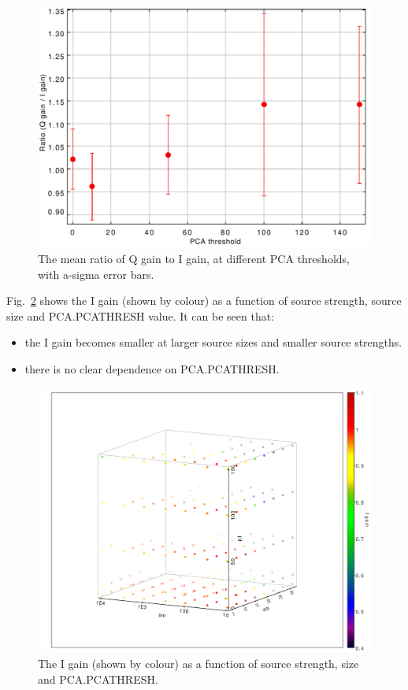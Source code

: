 \documentclass[twoside,11pt]{starlink}
\begin{document}
\begin{figure}
\includegraphics[width=0.9\columnwidth]{figs/ratio-pt}
\caption{The mean ratio of Q gain to I gain, at different PCA thresholds,
with a-sigma error bars.}
\label{fig:ratio-pt}
\end{figure}



Fig.~\ref{fig:igain} shows the I gain (shown by colour) as a function of source strength,
source size and PCA.PCATHRESH value. It can be seen that:

\begin{itemize}
\item the I gain becomes smaller at larger source sizes and smaller
source strengths.
\item there is no clear dependence on PCA.PCATHRESH.
\end{itemize}

\begin{figure}
\includegraphics[width=0.9\columnwidth]{figs/igain}
\caption{The I gain (shown by colour) as a function of source strength, size and
PCA.PCATHRESH.}
\label{fig:igain}
\end{figure}
\end{document}
